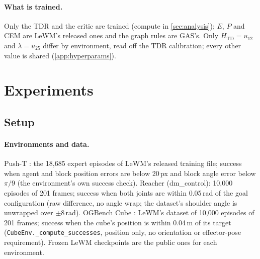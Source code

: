 \documentclass{article} %
\newcommand{\Htd}{H_{\mathrm{TD}}}
\newcommand{\todo}[1]{\textcolor{red}{[TODO: #1]}}
\newcommand{\keypoints}[1]{\par\medskip\noindent\fcolorbox{black!50}{black!5}{\begin{minipage}{0.96\linewidth}\small
\textbf{Key points this section must land.}\begin{itemize}[nosep,leftmargin=1.2em]#1\end{itemize}\end{minipage}}\par\medskip}
\begin{document}
\paragraph{What is trained.}
Only the TDR and the critic are trained (compute in \cref{sec:analysis}); $E$, $P$ and CEM are
LeWM's released ones and the graph rules are GAS's. Only $\Htd=u_{12}$ and $\lambda=u_{25}$ differ
by environment, read off the TDR calibration; every other value is shared (\cref{app:hyperparams}).

\section{Experiments}
\label{sec:experiments}

\subsection{Setup}
\label{sec:setup}

\paragraph{Environments and data.}
Push-T \citep{dinowm,lewm}: the 18{,}685 expert episodes of LeWM's released training file;
success when agent and block position errors are below 20\,px and block angle error below $\pi/9$
(the environment's own success check). Reacher (dm\_control): 10{,}000 episodes of 201
frames; success when both joints are within 0.05\,rad of the goal configuration (raw difference,
no angle wrap; the dataset's shoulder angle is unwrapped over $\pm8$\,rad). OGBench Cube
\citep{ogbench}: LeWM's dataset \citep{lewm} of 10{,}000 episodes of 201 frames; success when the cube's position is within
0.04\,m of its target (\texttt{CubeEnv.\_compute\_successes}, position only, no orientation or
effector-pose requirement). Frozen LeWM
checkpoints are the public ones for each environment. 
\end{document}

